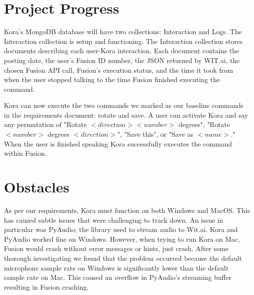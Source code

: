 \documentclass[onecolumn, draftclsnofoot,10pt, compsoc]{IEEEtran}
\begin{document}
\section{Project Progress}

	
	Kora's MongoDB database will have two collections: Interaction and Logs.
	The Interaction collection is setup and functioning.
	The Interaction collection stores documents describing each user-Kora interaction.
	Each document contains the posting date, the user's Fusion ID number, the JSON returned by WIT.ai, the chosen Fusion API call, Fusion's execution status, and the time it took from when the user stopped talking to the time Fusion finished executing the command.
	
	Kora can now execute the two commands we marked as our baseline commands in the requirements document: rotate and save.
	A user can activate Kora and say any permutation of "Rotate $<direction> <number>$ degrees", "Rotate $<number>$ degrees $<direction>$", "Save this", or "Save as $<name>$."
	When the user is finished speaking Kora successfully executes the command within Fusion.
	



\section{Obstacles}

	
		As per our requirements, Kora must function on both Windows and MacOS.
		This has caused subtle issues that were challenging to track down.
		An issue in particular was PyAudio; the library used to stream audio to Wit.ai.
		Kora and PyAudio worked fine on Windows.
		However, when trying to run Kora on Mac, Fusion would crash without error messages or hints, just crash.
		After some thorough investigating we found that the problem occurred because the default microphone sample rate on Windows is significantly lower than the default sample rate on Mac.
		This caused an overflow in PyAudio's streaming buffer resulting in Fusion crashing.
		
\end{document}
